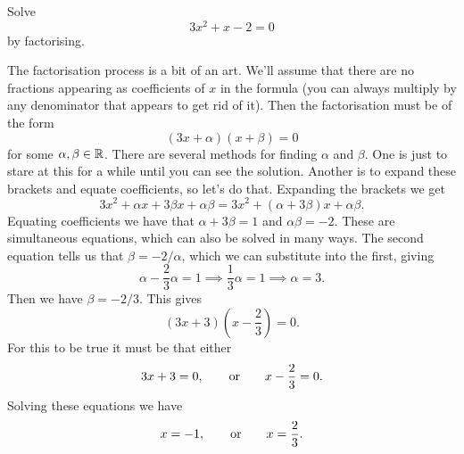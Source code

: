 \documentclass[fleqn]{LectureClass/LectureClass}
\begin{document}
    \begin{exm}{}{}
        Solve
        \begin{equation}
            3x^2 + x - 2 = 0
        \end{equation}
        by factorising.
        
        The factorisation process is a bit of an art.
        We'll assume that there are no fractions appearing as coefficients of \(x\) in the formula (you can always multiply by any denominator that appears to get rid of it).
        Then the factorisation must be of the form
        \begin{equation}
            (3x + \alpha)(x + \beta) = 0
        \end{equation}
        for some \(\alpha, \beta \in \mathbb{R}\).
        There are several methods for finding \(\alpha\) and \(\beta\).
        One is just to stare at this for a while until you can see the solution.
        Another is to expand these brackets and equate coefficients, so let's do that.
        Expanding the brackets we get
        \begin{equation}
            3x^2 + \alpha x + 3\beta x + \alpha \beta = 3x^2 + (\alpha + 3\beta) x + \alpha \beta.
        \end{equation}
        Equating coefficients we have that \(\alpha + 3\beta = 1\) and \(\alpha \beta = -2\).
        These are simultaneous equations, which can also be solved in many ways.
        The second equation tells us that \(\beta = -2/\alpha\), which we can substitute into the first, giving
        \begin{equation}
            \alpha - \frac{2}{3}\alpha = 1 \implies \frac{1}{3}\alpha = 1 \implies \alpha = 3.
        \end{equation}
        Then we have \(\beta = -2/3\).
        This gives
        \begin{equation}
            \left( 3x + 3 \right)\left( x - \frac{2}{3} \right) = 0.
        \end{equation}
        For this to be true it must be that either
        \begin{equation}
            3x + 3 = 0, \qquad\text{or}\qquad x - \frac{2}{3} = 0.
        \end{equation}
        Solving these equations we have
        \begin{equation}
            x = -1, \qquad\text{or}\qquad x = \frac{2}{3}.
        \end{equation}
    \end{exm}
    
\end{document}
